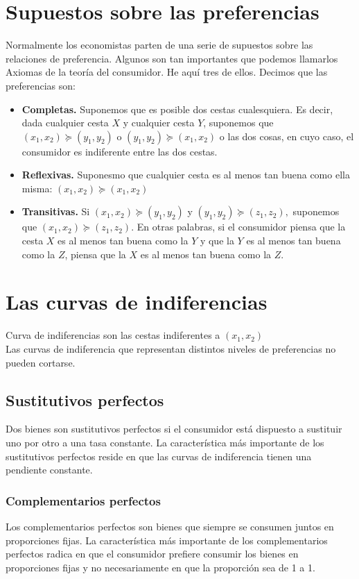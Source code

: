 \documentclass[10pt]{article}
\begin{document}
\section*{Supuestos sobre las preferencias}
Normalmente los economistas parten de una serie de supuestos sobre las relaciones de preferencia. Algunos son tan importantes que podemos llamarlos Axiomas de la teoría del consumidor. He aquí tres de ellos. Decimos que las preferencias son:
\begin{itemize}
    \item \textbf{Completas.} Suponemos que es posible dos cestas cualesquiera. Es decir, dada cualquier cesta $X$ y cualquier cesta $Y$, suponemos que $(x_1,x_2)\succeq (y_1,y_2)$ o $(y_1,y_2)\succeq (x_1,x_2)$ o las dos cosas, en cuyo caso, el consumidor es indiferente entre las dos cestas.
    \item \textbf{Reflexivas.} Suponesmo que cualquier cesta es al menos tan buena como ella misma: $(x_1,x_2) \succeq (x_1,x_2)$
    \item \textbf{Transitivas.} Si $(x_1,x_2) \succeq (y_1,y_2)$ y $(y_1,y_2) \succeq (z_1,z_2),$ suponemos que $(x_1,x_2) \succeq (z_1,z_2)$. En otras palabras, si el consumidor piensa que la cesta $X$ es al menos tan buena como la $Y$ y que la $Y$ es al menos tan buena como la $Z$, piensa que la $X$ es al menos tan buena como la $Z$. 
\end{itemize}
\section*{Las curvas de indiferencias}
Curva de indiferencias son las cestas indiferentes a $(x_1,x_2)$\\
Las curvas de indiferencia que representan distintos niveles de preferencias no pueden cortarse.

\subsection*{Sustitutivos perfectos}
Dos bienes son sustitutivos perfectos si el consumidor está dispuesto a sustituir uno por otro  a una tasa constante. La característica más importante de los sustitutivos perfectos reside en que las curvas de indiferencia tienen una pendiente constante.

\subsubsection*{Complementarios perfectos}
Los complementarios perfectos son bienes que siempre se consumen juntos en proporciones fijas. La característica más importante de los complementarios perfectos radica en que el consumidor prefiere consumir los bienes en proporciones fijas y no necesariamente en que la proporción sea de 1 a 1.
\end{document}
